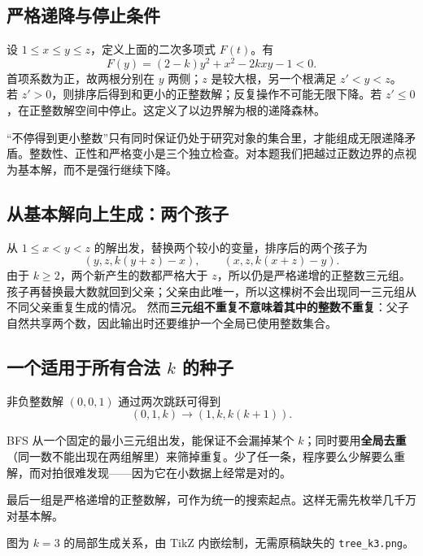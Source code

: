 \documentclass[UTF8,a4paper,11pt,twoside,openright,fontset=fandol]{ctexbook}
\theoremstyle{definition}
\begin{document}
\subsection{严格递降与停止条件}
设 $1\le x\le y\le z$，定义上面的二次多项式 $F(t)$。有
\[
 F(y)=(2-k)y^2+x^2-2kxy-1<0.
\]
首项系数为正，故两根分别在 $y$ 两侧；$z$ 是较大根，另一个根满足 $z'<y<z$。
若 $z'>0$，则排序后得到和更小的正整数解；反复操作不可能无限下降。若 $z'\le0$，在正整数解空间中停止。这定义了以边界解为根的递降森林。

\begin{pitfall}
“不停得到更小整数”只有同时保证仍处于研究对象的集合里，才能组成无限递降矛盾。整数性、正性和严格变小是三个独立检查。对本题我们把越过正数边界的点视为基本解，而不是强行继续下降。
\end{pitfall}

\subsection{从基本解向上生成：两个孩子}
从 $1\le x<y<z$ 的解出发，替换两个较小的变量，排序后的两个孩子为
\[
 (y,z,k(y+z)-x),\qquad (x,z,k(x+z)-y).
\]
由于 $k\ge2$，两个新产生的数都严格大于 $z$，所以仍是严格递增的正整数三元组。孩子再替换最大数就回到父亲；父亲由此唯一，所以这棵树不会出现同一三元组从不同父亲重复生成的情况。
然而\textbf{三元组不重复不意味着其中的整数不重复}：父子自然共享两个数，因此输出时还要维护一个全局已使用整数集合。

\subsection{一个适用于所有合法 \texorpdfstring{$k$}{k} 的种子}
非负整数解 $(0,0,1)$ 通过两次跳跃可得到
\[
 (0,1,k)\longrightarrow(1,k,k(k+1)).
\]

\begin{tip}
BFS 从一个固定的最小三元组出发，能保证不会漏掉某个 $k$；同时要用\textbf{全局去重}（同一数不能出现在两组解里）来筛掉重复。少了任一条，程序要么少解要么重解，而对拍很难发现——因为它在小数据上经常是对的。
\end{tip}

最后一组是严格递增的正整数解，可作为统一的搜索起点。这样无需先枚举几千万对基本解。

\begin{center}
\end{center}
图为 $k=3$ 的局部生成关系，由 TikZ 内嵌绘制，无需原稿缺失的 \texttt{tree\_k3.png}。
\end{document}
